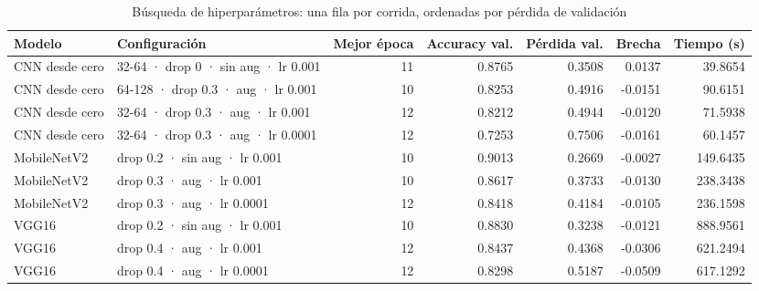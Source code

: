 \begin{table}
\caption{Búsqueda de hiperparámetros: una fila por corrida, ordenadas por pérdida de validación}
\label{tab:busqueda}
\begin{tabular}{llrrrrr}
\toprule
Modelo & Configuración & Mejor época & Accuracy val. & Pérdida val. & Brecha & Tiempo (s) \\
\midrule
CNN desde cero & 32-64 · drop 0 · sin aug · lr 0.001 & 11 & 0.8765 & 0.3508 & 0.0137 & 39.8654 \\
CNN desde cero & 64-128 · drop 0.3 · aug · lr 0.001 & 10 & 0.8253 & 0.4916 & -0.0151 & 90.6151 \\
CNN desde cero & 32-64 · drop 0.3 · aug · lr 0.001 & 12 & 0.8212 & 0.4944 & -0.0120 & 71.5938 \\
CNN desde cero & 32-64 · drop 0.3 · aug · lr 0.0001 & 12 & 0.7253 & 0.7506 & -0.0161 & 60.1457 \\
MobileNetV2 & drop 0.2 · sin aug · lr 0.001 & 10 & 0.9013 & 0.2669 & -0.0027 & 149.6435 \\
MobileNetV2 & drop 0.3 · aug · lr 0.001 & 10 & 0.8617 & 0.3733 & -0.0130 & 238.3438 \\
MobileNetV2 & drop 0.3 · aug · lr 0.0001 & 12 & 0.8418 & 0.4184 & -0.0105 & 236.1598 \\
VGG16 & drop 0.2 · sin aug · lr 0.001 & 10 & 0.8830 & 0.3238 & -0.0121 & 888.9561 \\
VGG16 & drop 0.4 · aug · lr 0.001 & 12 & 0.8437 & 0.4368 & -0.0306 & 621.2494 \\
VGG16 & drop 0.4 · aug · lr 0.0001 & 12 & 0.8298 & 0.5187 & -0.0509 & 617.1292 \\
\bottomrule
\end{tabular}
\end{table}
